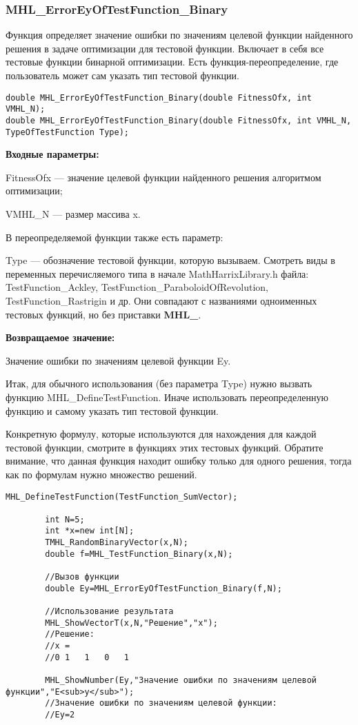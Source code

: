 \documentclass[a4paper,12pt]{article}
\begin{document}
\subsubsection{MHL\_ErrorEyOfTestFunction\_Binary}\label{MHL_ErrorEyOfTestFunction_Binary}

Функция определяет значение ошибки по значениям целевой функции найденного решения в задаче оптимизации для тестовой функции. Включает в себя все тестовые функции бинарной оптимизации. Есть функция-переопределение, где пользователь может сам указать тип тестовой функции.


\begin{lstlisting}[label=code_syntax_MHL_ErrorEyOfTestFunction_Binary,caption=Синтаксис]
double MHL_ErrorEyOfTestFunction_Binary(double FitnessOfx, int VMHL_N);
double MHL_ErrorEyOfTestFunction_Binary(double FitnessOfx, int VMHL_N, TypeOfTestFunction Type);
\end{lstlisting}

\textbf{Входные параметры:}

FitnessOfx --- значение целевой функции найденного решения алгоритмом оптимизации;

VMHL\_N --- размер массива x.

В переопределяемой функции также есть параметр:
  
Type --- обозначение тестовой функции, которую вызываем.
Смотреть виды в переменных перечисляемого типа в начале MathHarrixLibrary.h файла: TestFunction\_Ackley, TestFunction\_ParaboloidOfRevolution, TestFunction\_Rastrigin и др. Они совпадают с названиями одноименных тестовых функций, но без приставки \textbf{MHL\_}.

\textbf{Возвращаемое значение:}
 
Значение ошибки по значениям целевой функции Ey.

Итак, для обычного использования (без параметра Type) нужно вызвать функцию MHL\_DefineTestFunction. Иначе использовать переопределенную функцию и самому указать тип тестовой функции.

Конкретную формулу, которые используются для нахождения для каждой тестовой функции, смотрите в функциях этих тестовых функций. Обратите внимание, что данная функция находит ошибку только для одного решения, тогда как по формулам нужно множество решений.


\begin{lstlisting}[label=code_use_MHL_ErrorEyOfTestFunction_Binary,caption=Пример использования]
        MHL_DefineTestFunction(TestFunction_SumVector);

        int N=5;
        int *x=new int[N];
        TMHL_RandomBinaryVector(x,N);
        double f=MHL_TestFunction_Binary(x,N);

        //Вызов функции
        double Ey=MHL_ErrorEyOfTestFunction_Binary(f,N);

        //Использование результата
        MHL_ShowVectorT(x,N,"Решение","x");
        //Решение:
        //x =	
        //0	1	1	0	1

        MHL_ShowNumber(Ey,"Значение ошибки по значениям целевой функции","E<sub>y</sub>");
        //Значение ошибки по значениям целевой функции:
        //Ey=2
\end{lstlisting}
\end{document}
